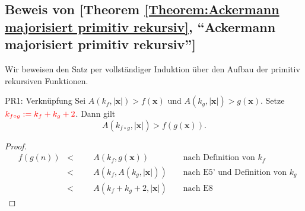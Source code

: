 \documentclass[a4paper]{amsart}
\theoremstyle{definition}
\newcommand{\myRef}[2]{[#1 \ref{#1:#2}, ``#2'']}
\newcommand{\bb}[1]{\mathbf{#1}}
\begin{document}
\subsection{Beweis von \myRef{Theorem}{Ackermann majorisiert primitiv rekursiv} }
Wir beweisen den Satz per vollständiger Induktion über den Aufbau der primitiv rekursiven Funktionen.

\begin{Theorem}{PR1: Verknüpfung}
    Sei $A( k_f, |\bb{x}| ) > f( \bb{x} )$ und $A( k_g, |\bb{x}| ) > g( \bb{x} )$. Setze
    $\color{red}{k_{f \circ g} := k_f + k_g + 2}$. Dann gilt
    \begin{equation*}
        A( k_{f \circ g}, |\bb{x}| ) > f ( g (\bb{x})).
    \end{equation*}
\end{Theorem}
\begin{proof}
    \begin{align*}
        &f(g(n)) & < &&& A(k_f, g(\bb{x}))          &&\text{ nach Definition von } k_f\\
        &        & < &&& A(k_f, A(k_g, |\bb{x}|))   &&\text{ nach E5' und Definition von } k_g\\
        &        & < &&& A(k_f + k_g + 2, |\bb{x}|) &&\text{ nach E8 }
    \end{align*}
\end{proof}
\end{document}
